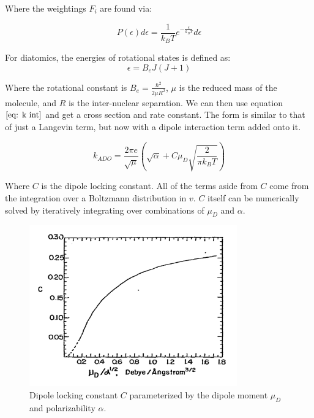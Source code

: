 Where the weightings $F_i$ are found via:

\begin{equation*}
    P(\epsilon) d\epsilon = \frac{1}{k_BT}e^{-\frac{\epsilon}{k_BT}}d\epsilon
\end{equation*}

For diatomics, the energies of rotational states is defined as:
\begin{equation*}
    \epsilon = B_e J(J+1)
\end{equation*}

Where the rotational constant is $B_e=\frac{\hbar^2}{2\mu R^2}$, $\mu$ is the reduced mass of the molecule, and $R$ is the inter-nuclear separation. We can then use equation $\ref{eq: k int}$ and get a cross section and rate constant. The form is similar to that of just a Langevin term, but now with a dipole interaction term added onto it.

\begin{equation}
    k_{ADO} = \frac{2 \pi e}{\sqrt{\mu}}\left(\sqrt{\alpha}+C \mu_D\sqrt{\frac{2}{\pi k_B T}}\right)
    \label{eq: k ADO}
\end{equation}

Where $C$ is the dipole locking constant. All of the terms aside from $C$ come from the integration over a Boltzmann distribution in $v$. $C$ itself can be numerically solved by iteratively integrating over combinations of $\mu_D$ and $\alpha$.\cite{Su1973}\cite{Troe1985}

\begin{figure}[H]
	\label{fig: C}
	\centering
	\includegraphics[width=0.8\textwidth]{images/ADO_C.pdf}
	\caption{Dipole locking constant $C$ parameterized by the dipole moment $\mu_D$ and polarizability $\alpha$.\cite{Su1973}}
\end{figure}
